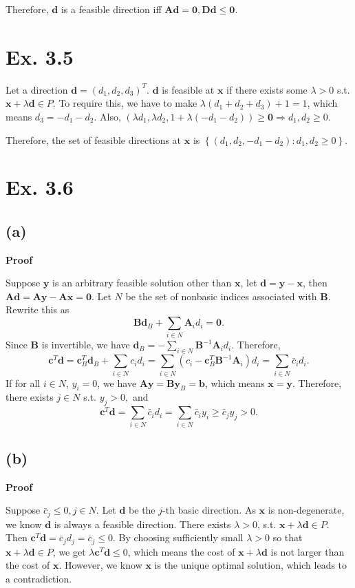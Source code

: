\documentclass[12pt]{article}
\begin{document}
Therefore, $\bm{d}$ is a feasible direction iff $\bm{Ad}=\bm{0},\bm{Dd}\le\bm{0}.$

\section*{Ex. 3.5}
Let a direction $\bm{d}=(d_1,d_2,d_3)^T$. $\bm{d}$ is feasible at $\bm{x}$ if there exists some $\lambda>0$ s.t. $\bm{x}+\lambda\bm{d}\in P$. To require this, we have to make $\lambda(d_1+d_2+d_3)+1=1$, which means $d_3=-d_1-d_2$. Also, $(\lambda d_1,\lambda d_2, 1+\lambda(-d_1-d_2))\ge\bm{0}\Rightarrow d_1,d_2\ge 0$.

Therefore, the set of feasible directions at $\bm{x}$ is $\left\{(d_1,d_2,-d_1-d_2):d_1,d_2\ge 0\right\}.$

\section*{Ex. 3.6}
\subsection*{(a)}
\textbf{Proof}

Suppose $\bm{y}$ is an arbitrary feasible solution other than $\bm{x}$, let $\bm{d}=\bm{y}-\bm{x}$, then $\bm{Ad}=\bm{Ay}-\bm{Ax}=\bm{0}$. Let $N$ be the set of nonbasic indices associated with $\bm{B}$. Rewrite this as $$\bm{B}\bm{d}_B+\sum_{i\in N}\bm{A}_id_i=\bm{0}.$$ Since $\bm{B}$ is invertible, we have $\bm{d}_B=-\sum_{i\in N}\bm{B}^{-1}\bm{A}_id_i.$ Therefore, $$\bm{c}^T\bm{d}=\bm{c}^T_B\bm{d}_B+\sum_{i\in N}c_id_i=\sum_{i\in N}(c_i-\bm{c}^T_B\bm{B}^{-1}\bm{A}_i)d_i=\sum_{i\in N}\bar{c}_id_i.$$ If for all $i\in N$, $y_i=0$, we have $\bm{Ay}=\bm{B}\bm{y}_B=\bm{b}$, which means $\bm{x}=\bm{y}$. Therefore, there exists $j\in N$ s.t. $y_j>0,$ and $$\bm{c}^T\bm{d}=\sum_{i\in N}\bar{c}_id_i=\sum_{i\in N}\bar{c}_iy_i\ge\bar{c}_jy_j>0.$$
\subsection*{(b)}
\textbf{Proof}

Suppose $\bar{c}_j\le 0,j\in N$. Let $\bm{d}$ be the $j$-th basic direction. As $\bm{x}$ is non-degenerate, we know $\bm{d}$ is always a feasible direction. There exists $\lambda>0$, s.t. $\bm{x}+\lambda\bm{d}\in P$. Then $\bm{c}^T\bm{d}=\bar{c}_jd_j=\bar{c}_j\le 0.$ By choosing sufficiently small $\lambda>0$ so that $\bm{x}+\lambda\bm{d}\in P$, we get $\lambda\bm{c}^T\bm{d}\le 0$, which means the cost of $\bm{x}+\lambda\bm{d}$ is not larger than the cost of $\bm{x}$. However, we know $\bm{x}$ is the unique optimal solution, which leads to a contradiction.
\end{document}
